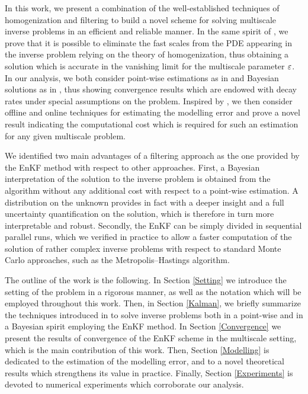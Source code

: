 In this work, we present a combination of the well-established techniques of homogenization and filtering to build a novel scheme for solving multiscale inverse problems in an efficient and reliable manner. In the same spirit of \cite{AbD17, AbD18}, we prove that it is possible to eliminate the fast scales from the PDE appearing in the inverse problem relying on the theory of homogenization, thus obtaining a solution which is accurate in the vanishing limit for the multiscale parameter $\varepsilon$. In our analysis, we both consider point-wise estimations as in \cite{ILS13} and Bayesian solutions as in \cite{ScS17}, thus showing convergence results which are endowed with decay rates under special assumptions on the problem. Inspired by \cite{CES14, CDS18, AbD18}, we then consider offline and online techniques for estimating the modelling error and prove a novel result indicating the computational cost which is required for such an estimation for any given multiscale problem.

We identified two main advantages of a filtering approach as the one provided by the EnKF method with respect to other approaches. First, a Bayesian interpretation of the solution to the inverse problem is obtained from the algorithm without any additional cost with respect to a point-wise estimation. A distribution on the unknown provides in fact with a deeper insight and a full uncertainty quantification on the solution, which is therefore in turn more interpretable and robust. Secondly, the EnKF can be simply divided in sequential parallel runs, which we verified in practice to allow a faster computation of the solution of rather complex inverse problems with respect to standard Monte Carlo approaches, such as the Metropolis--Hastings algorithm.

The outline of the work is the following. In Section \ref{Setting} we introduce the setting of the problem in a rigorous manner, as well as the notation which will be employed throughout this work. Then, in Section \ref{Kalman}, we briefly summarize the techniques introduced in \cite{ILS13, ScS17} to solve inverse problems both in a point-wise and in a Bayesian spirit employing the EnKF method. In Section \ref{Convergence} we present the results of convergence of the EnKF scheme in the multiscale setting, which is the main contribution of this work. Then, Section \ref{Modelling} is dedicated to the estimation of the modelling error, and to a novel theoretical results which strengthens its value in practice. Finally, Section \ref{Experiments} is devoted to numerical experiments which corroborate our analysis.

